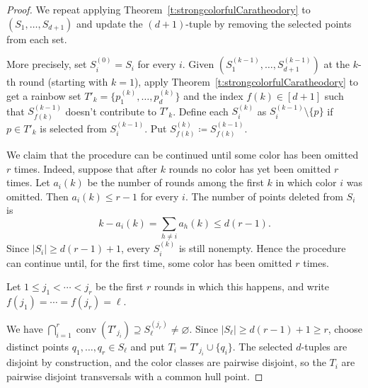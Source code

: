 \documentclass[11pt]{article}
\theoremstyle{definition}
\newcommand{\conv}{\operatorname{conv}}
\begin{document}
\begin{proof}
    We repeat applying Theorem~\ref{t:strongcolorfulCaratheodory} to $(S_1, \ldots, S_{d+1})$ and update the $(d+1)$-tuple by removing the selected points from each set.

    More precisely, set $S_i^{(0)} = S_i$ for every $i$.
    Given $(S_1^{(k-1)}, \ldots, S_{d+1}^{(k-1)})$ at the $k$-th round (starting with $k = 1$), apply Theorem~\ref{t:strongcolorfulCaratheodory} to get a rainbow set $T'_k = \{p^{(k)}_1, \ldots, p^{(k)}_d\}$ and the index $f(k) \in [d+1]$ such that $S^{(k-1)}_{f(k)}$ doesn't contribute to $T'_k$.
    Define each $S_i^{(k)}$ as $S_i^{(k-1)} \setminus \{p\}$ if $p \in T'_k$ is selected from $S_i^{(k-1)}$.
    Put $S_{f(k)}^{(k)} \coloneqq S_{f(k)}^{(k-1)}$.


    We claim that the procedure can be continued until some color has been omitted $r$ times. Indeed, suppose that after $k$ rounds no color has yet been omitted $r$ times. Let $a_i(k)$ be the number of rounds among the first $k$ in which color $i$ was omitted. Then $a_i(k)\leq r-1$ for every $i$. The number of points deleted from $S_i$ is
    \[
    k-a_i(k)=\sum_{h\neq i} a_h(k)\leq d(r-1).
    \]
    Since $|S_i|\geq d(r-1)+1$, every $S_i^{(k)}$ is still nonempty. Hence the procedure can continue until, for the first time, some color has been omitted $r$ times.

    Let $1\leq j_1<\cdots<j_r$ be the first $r$ rounds in which this happens, and write $f(j_1)=\cdots=f(j_r)=\ell$.

    We have $\bigcap_{i=1}^r\conv(T'_{j_i})\supseteq S^{(j_r)}_\ell\ne\varnothing$. Since $|S_\ell|\ge d(r-1)+1\ge r$, choose distinct points $q_1,\ldots,q_r\in S_\ell$ and put $T_i=T'_{j_i}\cup\{q_i\}$. The selected $d$-tuples are disjoint by construction, and the color classes are pairwise disjoint, so the $T_i$ are pairwise disjoint transversals with a common hull point.
    \end{proof}
\end{document}
